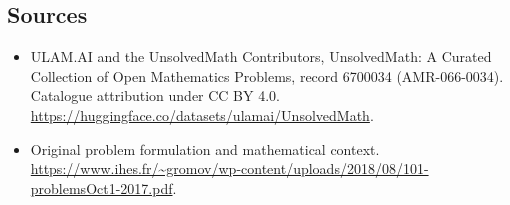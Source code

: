 \documentclass[11pt]{article}
\begin{document}
\subsection{Sources}
\begin{itemize}
\item[\hypertarget{source:6700034:1}{S1}] ULAM.AI and the UnsolvedMath Contributors, UnsolvedMath: A Curated Collection of Open Mathematics Problems, record 6700034 (AMR-066-0034). Catalogue attribution under CC BY 4.0.
\url{https://huggingface.co/datasets/ulamai/UnsolvedMath}.
\item[\hypertarget{source:6700034:2}{S2}] Original problem formulation and mathematical context.
\url{https://www.ihes.fr/~gromov/wp-content/uploads/2018/08/101-problemsOct1-2017.pdf}.
\end{itemize}
\label{end:6700034}
\end{document}
